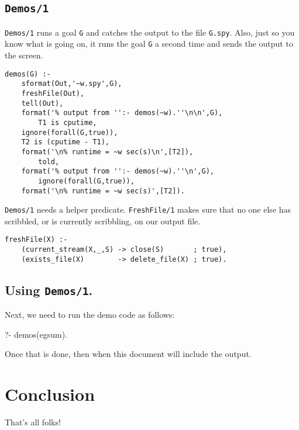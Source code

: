 \documentclass[twocolumn,global]{svjour}
\begin{document}
\subsection{ {\tt Demos/1}}

{\tt Demos/1} runs a goal {\tt G} and catches the output to the file
{\tt G.spy}. Also, just so you know what is going on,
it runs the goal {\tt G} a second time and sends the output to the screen. 

\begin{Verbatim}
demos(G) :-
    sformat(Out,'~w.spy',G),
    freshFile(Out),
    tell(Out),
    format('% output from '':- demos(~w).''\n\n',G),
        T1 is cputime,
    ignore(forall(G,true)),
    T2 is (cputime - T1),
    format('\n% runtime = ~w sec(s)\n',[T2]),
        told,
    format('% output from '':- demos(~w).''\n',G),  
        ignore(forall(G,true)),
    format('\n% runtime = ~w sec(s)',[T2]).
\end{Verbatim}

{\tt Demos/1} needs a helper predicate. {\tt FreshFile/1} 
makes sure that no one
else has scribbled, or is currently scribbling, on our output file.

\begin{Verbatim}
freshFile(X) :- 
    (current_stream(X,_,S) -> close(S)       ; true),
    (exists_file(X)        -> delete_file(X) ; true).
\end{Verbatim}
\subsection{ Using {\tt Demos/1}.}
 Next, we need to run the demo code as follows: 
\begin{LISTING}
?- demos(egsum).
\end{LISTING}
Once that is done, then when this document will include the
output.

\section{ Conclusion}
 That's all folks! 
\theend
\end{document}
